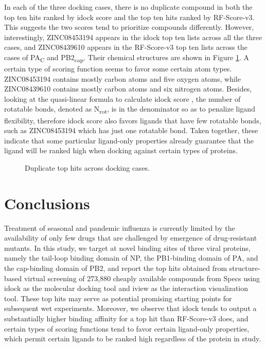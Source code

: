 In each of the three docking cases, there is no duplicate compound in both the top ten hits ranked by idock score and the top ten hits ranked by RF-Score-v3. This suggests the two scores tend to prioritize compounds differently. However, interestingly, ZINC08453194 appears in the idock top ten lists across all the three cases, and ZINC08439610 appears in the RF-Score-v3 top ten lists across the cases of PA\textsubscript{C} and PB2\textsubscript{cap}. Their chemical structures are shown in Figure \ref{influenza:dup}. A certain type of scoring function seems to favor some certain atom types. ZINC08453194 contains mostly carbon atoms and five oxygen atoms, while ZINC08439610 contains mostly carbon atoms and six nitrogen atoms. Besides, looking at the quasi-linear formula to calculate idock score \citep{595,1153,1362}, the number of rotatable bonds, denoted as N\textsubscript{rot}, is in the denominator so as to penalize ligand flexibility, therefore idock score also favors ligands that have few rotatable bonds, such as ZINC08453194 which has just one rotatable bond. Taken together, these indicate that some particular ligand-only properties already guarantee that the ligand will be ranked high when docking against certain types of proteins.

\begin{figure}
\centering
{}
\caption{Duplicate top hits across docking cases.}
\label{influenza:dup}
\end{figure}

\section{Conclusions}

Treatment of seasonal and pandemic influenza is currently limited by the availability of only few drugs that are challenged by emergence of drug-resistant mutants. In this study, we target at novel binding sites of three viral proteins, namely the tail-loop binding domain of NP, the PB1-binding domain of PA, and the cap-binding domain of PB2, and report the top hits obtained from structure-based virtual screening of 273,880 cheaply available compounds from Specs using idock \citep{1153,1362} as the molecular docking tool and iview \citep{1366} as the interaction visualization tool. These top hits may serve as potential promising starting points for subsequent wet experiments. Moreover, we observe that idock tends to output a substantially higher binding affinity for a top hit than RF-Score-v3 does, and certain types of scoring functions tend to favor certain ligand-only properties, which permit certain ligands to be ranked high regardless of the protein in study.

